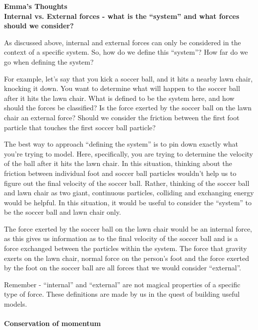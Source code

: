 \begin{framed}
\textbf{Emma's Thoughts}\\
\textbf{Internal vs. External forces - what is the ``system'' and what forces should we consider?}

As discussed above, internal and external forces can only be considered in the context of a specific system. So, how do we define this ``system''? How far do we go when defining the system?

For example, let's say that you kick a soccer ball, and it hits a nearby lawn chair, knocking it down. You want to determine what will happen to the soccer ball after it hits the lawn chair. What is defined to be the system here, and how should the forces be classified? Is the force exerted by the soccer ball on the lawn chair an external force? Should we consider the friction between the first foot particle that touches the first soccer ball particle?

The best way to approach ``defining the system'' is to pin down exactly what you're trying to model. Here, specifically, you are trying to determine the velocity of the ball after it hits the lawn chair. In this situation, thinking about the friction between individual foot and soccer ball particles wouldn't help us to figure out the final velocity of the soccer ball. Rather, thinking of the soccer ball and lawn chair as two giant, continuous particles, colliding and exchanging energy would be helpful. In this situation, it would be useful to consider the ``system'' to be the soccer ball and lawn chair only.

The force exerted by the soccer ball on the lawn chair would be an internal force, as this gives us information as to the final velocity of the soccer ball and is a force exchanged between the particles within the system. The force that gravity exerts on the lawn chair, normal force on the person's foot and the force exerted by the foot on the soccer ball are all forces that we would consider ``external''.

Remember - ``internal'' and ``external'' are not magical properties of a specific type of force. These definitions are made by us in the quest of building useful models.
\end{framed}

\paragraph{Conservation of momentum}

